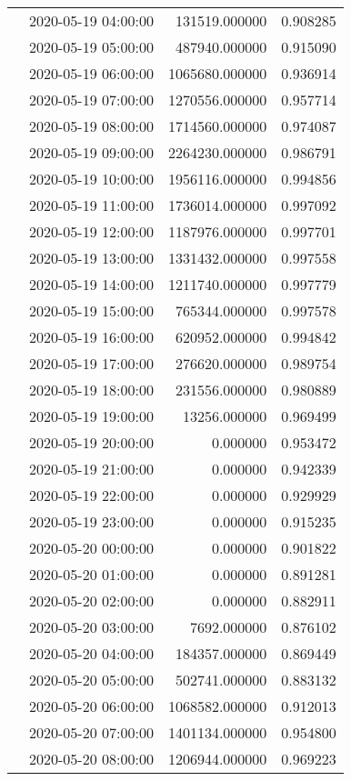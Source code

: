 \begin{tabular}{llrr}
 & 2020-05-19 04:00:00 & 131519.000000 & 0.908285 \\
 & 2020-05-19 05:00:00 & 487940.000000 & 0.915090 \\
 & 2020-05-19 06:00:00 & 1065680.000000 & 0.936914 \\
 & 2020-05-19 07:00:00 & 1270556.000000 & 0.957714 \\
 & 2020-05-19 08:00:00 & 1714560.000000 & 0.974087 \\
 & 2020-05-19 09:00:00 & 2264230.000000 & 0.986791 \\
 & 2020-05-19 10:00:00 & 1956116.000000 & 0.994856 \\
 & 2020-05-19 11:00:00 & 1736014.000000 & 0.997092 \\
 & 2020-05-19 12:00:00 & 1187976.000000 & 0.997701 \\
 & 2020-05-19 13:00:00 & 1331432.000000 & 0.997558 \\
 & 2020-05-19 14:00:00 & 1211740.000000 & 0.997779 \\
 & 2020-05-19 15:00:00 & 765344.000000 & 0.997578 \\
 & 2020-05-19 16:00:00 & 620952.000000 & 0.994842 \\
 & 2020-05-19 17:00:00 & 276620.000000 & 0.989754 \\
 & 2020-05-19 18:00:00 & 231556.000000 & 0.980889 \\
 & 2020-05-19 19:00:00 & 13256.000000 & 0.969499 \\
 & 2020-05-19 20:00:00 & 0.000000 & 0.953472 \\
 & 2020-05-19 21:00:00 & 0.000000 & 0.942339 \\
 & 2020-05-19 22:00:00 & 0.000000 & 0.929929 \\
 & 2020-05-19 23:00:00 & 0.000000 & 0.915235 \\
 & 2020-05-20 00:00:00 & 0.000000 & 0.901822 \\
 & 2020-05-20 01:00:00 & 0.000000 & 0.891281 \\
 & 2020-05-20 02:00:00 & 0.000000 & 0.882911 \\
 & 2020-05-20 03:00:00 & 7692.000000 & 0.876102 \\
 & 2020-05-20 04:00:00 & 184357.000000 & 0.869449 \\
 & 2020-05-20 05:00:00 & 502741.000000 & 0.883132 \\
 & 2020-05-20 06:00:00 & 1068582.000000 & 0.912013 \\
 & 2020-05-20 07:00:00 & 1401134.000000 & 0.954800 \\
 & 2020-05-20 08:00:00 & 1206944.000000 & 0.969223 \\

\end{tabular}
